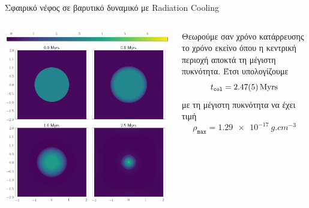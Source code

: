 \documentclass{beamer}
\begin{document}
\begin{frame}{Σφαιρικό νέφος σε βαρυτικό δυναμικό με Radiation Cooling}
	
	\begin{columns}
		\begin{center}
			\includegraphics[width=1\linewidth]{../Document/DataImages/H2CoolGRquad}
		\end{center}
		Θεωρούμε σαν χρόνο κατάρρευσης το χρόνο εκείνο όπου η κεντρική περιοχή αποκτά τη μέγιστη πυκνότητα. Έτσι υπολογίζουμε 
		\begin{equation}
		t_\mathtt{col}=\SI{2.47\pm 0.05}{Myrs}
		\end{equation}
		με τη μέγιστη πυκνότητα να έχει τιμή
		\begin{equation}
		\rho _\mathtt{max}=\SI{1.29e-17}{g.cm^{-3}}
		\end{equation}
	\end{columns}
\end{frame}
\end{document}
